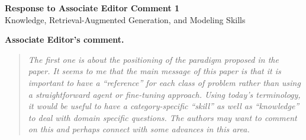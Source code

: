 \documentclass[11pt]{article}
\begin{document}
\begin{center}
{\Large\bfseries Response to Associate Editor Comment 1}\\[0.4em]
{Knowledge, Retrieval-Augmented Generation, and Modeling Skills}
\end{center}
\textbf{Associate Editor's comment.}
\begin{quote}\itshape
The first one is about the positioning of the paradigm proposed in the paper.
It seems to me that the main message of this paper is that it is important to
have a ``reference'' for each class of problem rather than using a straightforward
agent or fine-tuning approach. Using today's terminology, it would be useful to
have a category-specific ``skill'' as well as ``knowledge'' to deal with domain
specific questions. The authors may want to comment on this and perhaps connect
with some advances in this area.
\end{quote}
\end{document}
